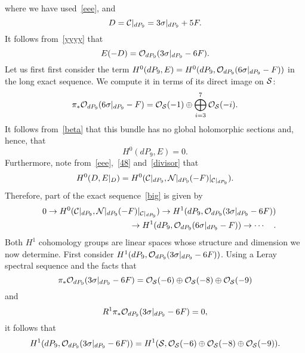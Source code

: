 \documentclass[a4paper,12pt]{article}
\numberwithin{equation}{section}
\theoremstyle{plain}
\begin{document}
%
where we have used~\eqref{eee}, and
%
\begin{equation}
D={\cal C}|_{dP_9} = 3 \sigma|_{dP_9} + 5F.
\label{divisor}
\end{equation}
%
It follows from~\eqref{yyyy} that
%
\begin{equation}
E(-D)={\cal O}_{dP_9}(3 \sigma|_{dP_9} -6F).
\label{zzzz}
\end{equation}
%
Let us first first consider the term $H^{0}(dP_{9},E)=H^{0}(dP_9, {\cal
O}_{dP_9}
(6 \sigma|_{dP_9} -F))$ in the long exact sequence.
We compute it in terms of its direct image on ${\cal{S}}$:
%
\begin{equation}
\pi_{*}{\cal O}_{dP_9} (6 \sigma|_{dP_9} -F) =
{\cal O}_{{\cal{S}}}(-1) \oplus \bigoplus_{i=3}^{7} {\cal
O}_{{\cal{S}}}(-i).
\label{49}
\end{equation}
%
It follows from~\eqref{beta} that this bundle has no global holomorphic
sections and, hence, that
%
\begin{equation}
H^{0}(dP_9, E)=0.
\label{50}
\end{equation}
%
Furthermore, note from~\eqref{eee},~\eqref{48} and~\eqref{divisor} that
%
\begin{equation}
H^{0}(D, E|_{D}) =
H^{0}({\cal C}|_{dP_9}, {\cal N}|_{dP_9}
(-F)|_{{\cal C}|_{dP_9}}).
\label{51}
\end{equation}
%
Therefore, part of the exact sequence~\eqref{big} is given by
%
\begin{eqnarray}
&&0 \rightarrow H^{0}({\cal C}|_{dP_9}, {\cal N}|_{dP_9}
(-F)|_{{\cal C}|_{dP_9}})
\rightarrow H^{1}(dP_9, {\cal O}_{dP_9}(3 \sigma|_{dP_9} -6F))
\nonumber \\
&&\rightarrow
H^{1}(dP_9, {\cal O}_{dP_9}(6 \sigma|_{dP_9} -F))
\rightarrow \cdots \quad .
\label{exact}
\end{eqnarray}
%
Both $H^{1}$ cohomology groups are linear spaces whose structure and
dimension we now determine. First consider
$H^{1}(dP_9, {\cal O}_{dP_9}(3 \sigma|_{dP_9} -6F))$. Using a Leray
spectral
sequence and the facts that
%
\begin{equation}
\pi_{*} {\cal O}_{dP_9}(3 \sigma|_{dP_9} -6F) =
{\cal O}_{{\cal S}}(-6) \oplus {\cal O}_{{\cal S}}(-8)
\oplus {\cal O}_{{\cal S}}(-9)
\label{52}
\end{equation}
%
and
%
\begin{equation}
R^{1}\pi_{*} {\cal O}_{dP_9}(3 \sigma|_{dP_9} -6F) = 0,
\label{52a}
\end{equation}
%
it follows that
%
\begin{equation}
H^{1}(dP_9, {\cal O}_{dP_9}(3 \sigma|_{dP_9} -6F)) =
H^{1} ({\cal S}, {\cal O}_{{\cal S}}(-6) \oplus {\cal O}_{{\cal S}}(-8)
\oplus {\cal O}_{{\cal S}}(-9)).
\label{first}
\end{equation}
\end{document}
